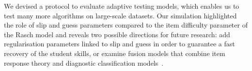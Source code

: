 \documentclass{sig-alternate}
\begin{document}



We devised a protocol to evaluate adaptive testing models, which enables us to test many more algorithms on large-scale datasets. Our simulation highlighted the role of slip and guess parameters compared to the item difficulty parameter of the Rasch model and reveals two possible directions for future research: add regularisation parameters linked to slip and guess in order to guarantee a fast recovery of the student skills, or examine fusion models that combine item response theory and diagnostic classification models~\cite{McGlohen2008,Bradshaw2014}.






\end{document}
